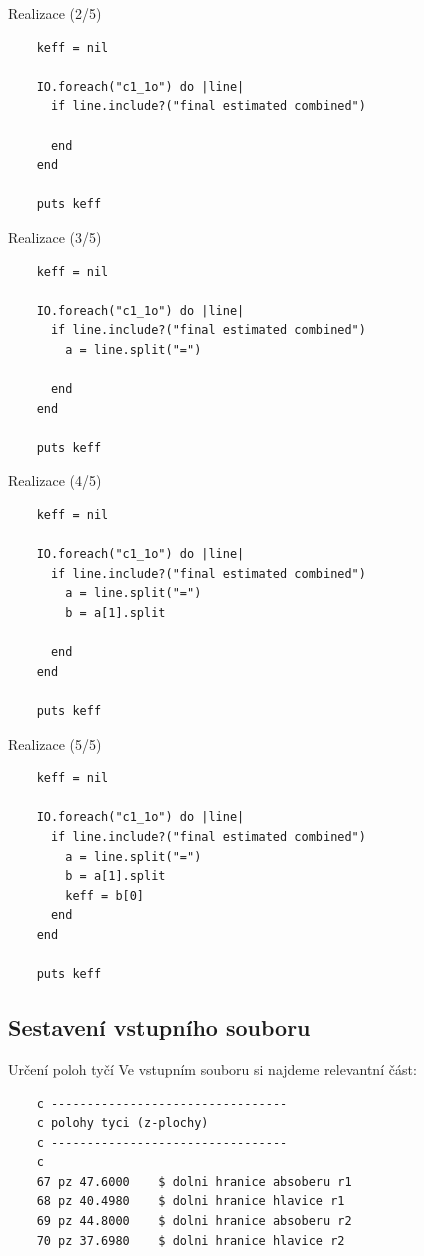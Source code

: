 \documentclass{beamer}
\begin{document}
\begin{frame}[fragile]{Realizace (2/5)}
  \scriptsize
  \begin{verbatim}
    keff = nil

    IO.foreach("c1_1o") do |line|
      if line.include?("final estimated combined")

      end
    end

    puts keff
  \end{verbatim}
\end{frame}

\begin{frame}[fragile]{Realizace (3/5)}
  \scriptsize
  \begin{verbatim}
    keff = nil

    IO.foreach("c1_1o") do |line|
      if line.include?("final estimated combined")
        a = line.split("=")

      end
    end

    puts keff
  \end{verbatim}
\end{frame}

\begin{frame}[fragile]{Realizace (4/5)}
  \scriptsize
  \begin{verbatim}
    keff = nil

    IO.foreach("c1_1o") do |line|
      if line.include?("final estimated combined")
        a = line.split("=")
        b = a[1].split

      end
    end

    puts keff
  \end{verbatim}
\end{frame}

\begin{frame}[fragile]{Realizace (5/5)}
  \scriptsize
  \begin{verbatim}
    keff = nil

    IO.foreach("c1_1o") do |line|
      if line.include?("final estimated combined")
        a = line.split("=")
        b = a[1].split
        keff = b[0]
      end
    end

    puts keff
  \end{verbatim}
\end{frame}


\subsection{Sestavení vstupního souboru}

\begin{frame}[fragile]{Určení poloh tyčí}
  Ve vstupním souboru si najdeme relevantní část:
  \scriptsize
  \begin{verbatim}
    c ---------------------------------
    c polohy tyci (z-plochy)
    c ---------------------------------
    c
    67 pz 47.6000    $ dolni hranice absoberu r1
    68 pz 40.4980    $ dolni hranice hlavice r1
    69 pz 44.8000    $ dolni hranice absoberu r2
    70 pz 37.6980    $ dolni hranice hlavice r2
  \end{verbatim}
\end{frame}
\end{document}
